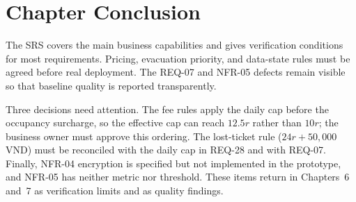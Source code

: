 \section{Chapter Conclusion}
The SRS covers the main business capabilities and gives verification conditions for most requirements. Pricing, evacuation priority, and data-state rules must be agreed before real deployment. The REQ-07 and NFR-05 defects remain visible so that baseline quality is reported transparently.

Three decisions need attention. The fee rules apply the daily cap before the occupancy surcharge, so the effective cap can reach $12.5r$ rather than $10r$; the business owner must approve this ordering. The lost-ticket rule ($24r+50{,}000$ VND) must be reconciled with the daily cap in REQ-28 and with REQ-07. Finally, NFR-04 encryption is specified but not implemented in the prototype, and NFR-05 has neither metric nor threshold. These items return in Chapters~6 and~7 as verification limits and as quality findings.
